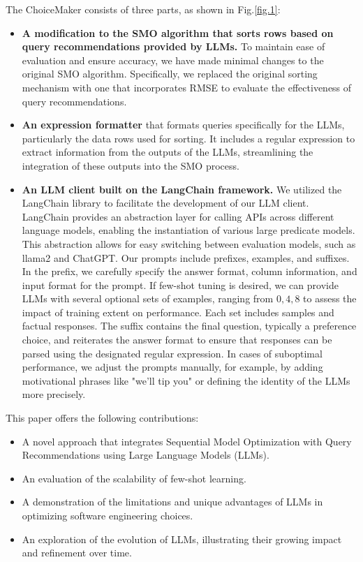 \documentclass{ieeeaccess}
\begin{document}
  The ChoiceMaker consists of three parts, as shown in Fig.\ref{fig.1}:
  \begin{itemize}
  
  \item \textbf{A modification to the SMO algorithm that sorts rows based on query recommendations provided by LLMs.}
  To maintain ease of evaluation and ensure accuracy, we have made minimal changes to the original SMO algorithm. Specifically, we replaced the original sorting mechanism with one that incorporates RMSE to evaluate the effectiveness of query recommendations.
  
  \item \textbf{An expression formatter}
  that formats queries specifically for the LLMs, particularly the data rows used for sorting. It includes a regular expression to extract information from the outputs of the LLMs, streamlining the integration of these outputs into the SMO process.
  
  \item \textbf{An LLM client built on the LangChain framework.}
  We utilized the LangChain library to facilitate the development of our LLM client. LangChain provides an abstraction layer for calling APIs across different language models, enabling the instantiation of various large predicate models. This abstraction allows for easy switching between evaluation models, such as llama2 and ChatGPT. Our prompts include prefixes, examples, and suffixes. In the prefix, we carefully specify the answer format, column information, and input format for the prompt. If few-shot tuning is desired, we can provide LLMs with several optional sets of examples, ranging from ${0,4,8}$ to assess the impact of training extent on performance. Each set includes samples and factual responses. The suffix contains the final question, typically a preference choice, and reiterates the answer format to ensure that responses can be parsed using the designated regular expression. In cases of suboptimal performance, we adjust the prompts manually, for example, by adding motivational phrases like "we'll tip you" or defining the identity of the LLMs more precisely.
  
  \end{itemize}

  This paper offers the following contributions:
  \begin{itemize}
    \item A novel approach that integrates Sequential Model Optimization with Query Recommendations using Large Language Models (LLMs).
    \item An evaluation of the scalability of few-shot learning.
    \item A demonstration of the limitations and unique advantages of LLMs in optimizing software engineering choices.
    \item An exploration of the evolution of LLMs, illustrating their growing impact and refinement over time.
    \end{itemize}
  
\end{document}
